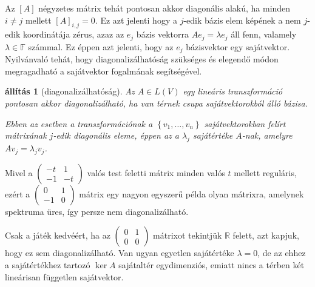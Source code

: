 \documentclass[9pt, a4paper, showtrims]{memoir}
\theoremstyle{plain}
\newtheorem{proposition}{állítás}[chapter]
\theoremstyle{remark}
\theoremstyle{definition}
\begin{document}
    Az $\left[ A \right]$ négyzetes mátrix tehát pontosan akkor diagonális alakú, 
    ha minden $i\neq j$ mellett $\left[ A \right]_{i,j}=0.$
    Ez azt jelenti hogy a $j$-edik bázis elem képének a nem $j$-edik koordinátája zérus,
    azaz az $e_j$ bázis vektorra $Ae_j=\lambda e_j$ áll fenn,
    valamely $\lambda\in\mathbb{F}$ számmal.
    Ez éppen azt jelenti, 
    hogy az $e_j$ bázisvektor egy sajátvektor.
    Nyilvánvaló tehát, 
    hogy diagonalizálhatóság szükséges és elegendő módon megragadható a sajátvektor fogalmának segítségével.
    \begin{proposition}[diagonalizálhatóság]
        Az $A\in L\left( V \right)$ egy lineáris transzformáció
        pontosan akkor diagonalizálható,
        ha van térnek csupa sajátvektorokból álló bázisa.

        Ebben az esetben a transzformációnak a $\left\{ v_1,\dots,v_n \right\}$ sajátvektorokban felírt mátrixának
        $j$-edik diagonális eleme, 
        éppen az a $\lambda_j$ sajátértéke $A$-nak,
        amelyre $Av_j=\lambda_jv_j$.
    \end{proposition}
    Mivel a 
    \begin{math}
        \begin{pmatrix}
            -t&1\\-1&-t
        \end{pmatrix}
    \end{math}
    valós test feletti mátrix minden valós $t$ mellett reguláris, 
    ezért a 
    \begin{math}
        \begin{pmatrix}
            0&1\\-1&0
        \end{pmatrix}
    \end{math}
    mátrix egy nagyon egyszerű példa olyan mátrixra, amelynek spektruma üres,
    így persze nem diagonalizálható.

    Csak a játék kedvéért, ha az
    \begin{math}
        \begin{pmatrix}
            0&1\\0&0
        \end{pmatrix}
    \end{math}
    mátrixot tekintjük $\mathbb{R}$ felett, 
    azt kapjuk, hogy ez sem diagonalizálható.
    Van ugyan egyetlen sajátértéke $\lambda=0$,
    de az ehhez a sajátértékhez tartozó $\ker A$ sajátaltér egydimenziós,
    emiatt nincs a térben két lineárisan független sajátvektor.
\end{document}
